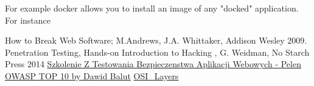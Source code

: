 \documentclass{article}[12pt]
\begin{document}
For example docker allows you to install an image of any "docked" application.
For instance


\begin{thebibliography}{9}
How to Break Web Software; M.Andrews, J.A. Whittaker, Addison Wesley 2009.
Penetration Testing, Hands-on Introduction to Hacking , G. Weidman, No Starch Press 2014
\href{https://www.youtube.com/watch?v=04c0JiE8YNQ}{Szkolenie Z Testowania Bezpieczenstwa Aplikacji Webowych - Pelen OWASP TOP 10 by Dawid Balut}
\href{https://www.webopedia.com/quick_ref/OSI_Layers.asp}{OSI\_Layers}

\end{thebibliography}
\end{document}
